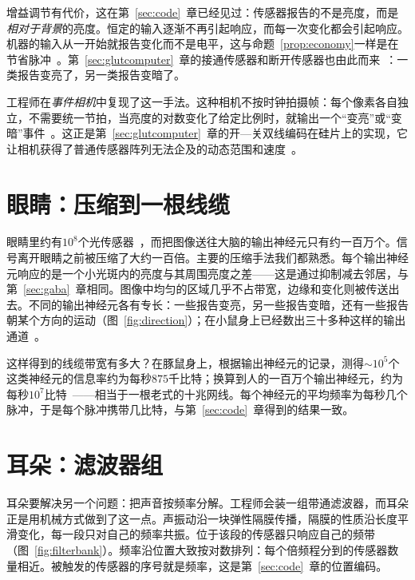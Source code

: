 增益调节有代价，这在第~\ref{sec:code}~章已经见过：传感器报告的不是亮度，而是\emph{相对于背景}的亮度。恒定的输入逐渐不再引起响应，而每一次变化都会引起响应。机器的输入从一开始就报告变化而不是电平，这与命题~\ref{prop:economy}一样是在节省脉冲~\cite{Barlow1961}。第~\ref{sec:glutcomputer}~章的接通传感器和断开传感器也由此而来~\cite{Schiller1992}：一类报告变亮了，另一类报告变暗了。

工程师在\emph{事件相机}中复现了这一手法。这种相机不按时钟拍摄帧：每个像素各自独立，不需要统一节拍，当亮度的对数变化了给定比例时，就输出一个“变亮”或“变暗”事件~\cite{Lichtsteiner2008}。这正是第~\ref{sec:glutcomputer}~章的开—关双线编码在硅片上的实现，它让相机获得了普通传感器阵列无法企及的动态范围和速度~\cite{Gallego2022}。

\section{眼睛：压缩到一根线缆}

眼睛里约有$10^8$个光传感器~\cite{Curcio1990}，而把图像送往大脑的输出神经元只有约一百万个。信号离开眼睛之前被压缩了大约一百倍。主要的压缩手法我们都熟悉。每个输出神经元响应的是一个小光斑内的亮度与其周围亮度之差——这是通过抑制减去邻居，与第~\ref{sec:gaba}~章相同。图像中均匀的区域几乎不占带宽，边缘和变化则被传送出去。不同的输出神经元各有专长：一些报告变亮，另一些报告变暗，还有一些报告朝某个方向的运动（图~\ref{fig:direction}）；在小鼠身上已经数出三十多种这样的输出通道~\cite{Baden2016}。

这样得到的线缆带宽有多大？在豚鼠身上，根据输出神经元的记录，测得$\sim10^5$个这类神经元的信息率约为每秒$875$千比特；换算到人的一百万个输出神经元，约为每秒$10^7$比特~\cite{Koch2006}——相当于一根老式的十兆网线。每个神经元的平均频率为每秒几个脉冲，于是每个脉冲携带几比特，与第~\ref{sec:code}~章得到的结果一致。

\section{耳朵：滤波器组}

耳朵要解决另一个问题：把声音按频率分解。工程师会装一组带通滤波器，而耳朵正是用机械方式做到了这一点。声振动沿一块弹性隔膜传播，隔膜的性质沿长度平滑变化，每一段只对自己的频率共振。位于该段的传感器只响应自己的频带（图~\ref{fig:filterbank}）。频率沿位置大致按对数排列：每个倍频程分到的传感器数量相近。被触发的传感器的序号就是频率，这是第~\ref{sec:code}~章的位置编码。

